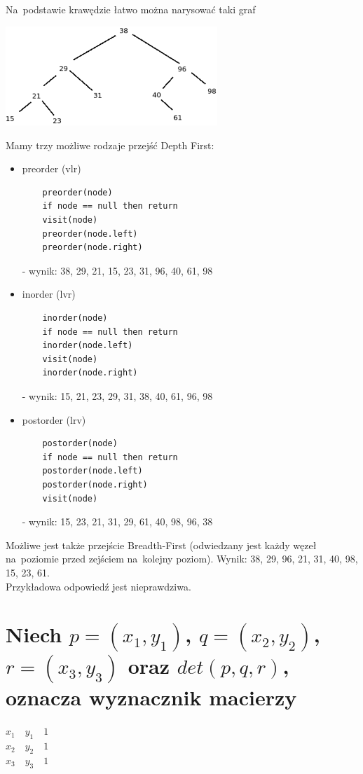 \vspace{0.4cm}

Na~podstawie krawędzie łatwo można narysować taki graf

\begin{center}
	\includegraphics[width=8cm]{03/bst}
\end{center}

Mamy trzy możliwe rodzaje przejść Depth First:
\begin{itemize}
	\item preorder (vlr) 
	\begin{lstlisting}
	preorder(node)
	if node == null then return
	visit(node)
	preorder(node.left) 
	preorder(node.right)
	\end{lstlisting}
	- wynik:  38, 29, 21, 15, 23, 31, 96, 40, 61, 98
	\item inorder (lvr) 
	\begin{lstlisting}
	inorder(node)
	if node == null then return
	inorder(node.left)
	visit(node)
	inorder(node.right)
	\end{lstlisting}
	- wynik: 15, 21, 23, 29, 31, 38, 40, 61, 96, 98
	\item postorder (lrv)
	\begin{lstlisting}
	postorder(node)
	if node == null then return
	postorder(node.left)
	postorder(node.right)
	visit(node)
	\end{lstlisting}
	- wynik: 15, 23, 21, 31, 29, 61, 40, 98, 96, 38
\end{itemize}

Możliwe jest także przejście Breadth-First (odwiedzany jest każdy węzeł na~poziomie przed zejściem na~kolejny poziom). Wynik: 38, 29, 96, 21, 31, 40, 98, 15, 23, 61.\\
Przykładowa odpowiedź jest nieprawdziwa.


\section{Niech $p=(x_1, y_1)$, $q=(x_2, y_2)$, $r=(x_3, y_3)$ oraz $det(p, q, r)$, oznacza wyznacznik macierzy}
\noindent $x_1 \quad y_1 \quad 1$ \\
$x_2 \quad y_2 \quad 1$ \\
$x_3 \quad y_3 \quad 1$


